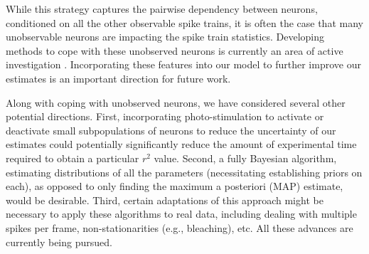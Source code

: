 While this strategy captures the pairwise dependency between neurons, conditioned on all the other observable spike trains, it is often the case that many unobservable neurons are impacting the spike train statistics.  Developing methods to cope with these unobserved neurons is currently an area of active investigation \cite{Duane 1 and 2, liam}.  Incorporating these features into our model to further improve our estimates is an important direction for future work.

Along with coping with unobserved neurons, we have considered several other potential directions.  First, incorporating photo-stimulation to activate or deactivate small subpopulations of neurons to reduce the uncertainty of our estimates could potentially significantly reduce the amount of experimental time required to obtain a particular $r^2$ value.  Second, a fully Bayesian algorithm, estimating distributions of all the parameters (necessitating establishing priors on each), as opposed to only finding the maximum a posteriori (MAP) estimate, would be desirable.  Third, certain adaptations of this approach might be necessary to apply these algorithms to real data, including dealing with multiple spikes per frame, non-stationarities (e.g., bleaching), etc.  All these advances are currently being pursued.




